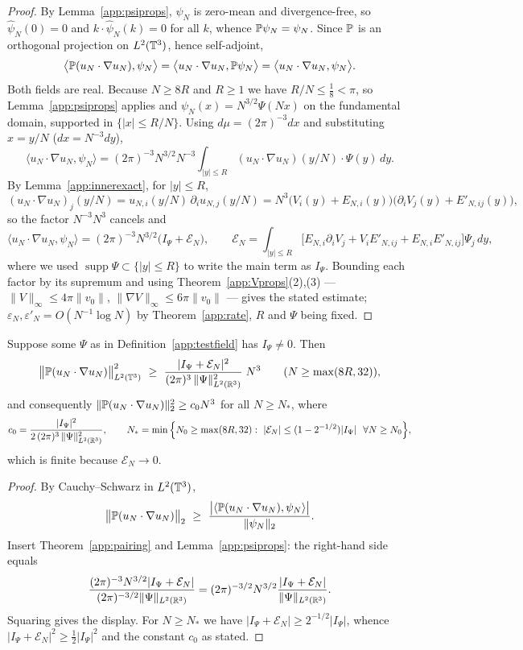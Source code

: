 \begin{proof}
By Lemma~\ref{app:psiprops}, $\psi_N$ is zero-mean and divergence-free,
so $\hat\psi_N(0)=0$ and $k\cdot\hat\psi_N(k)=0$ for all $k$, whence
$\mathbb P\psi_N=\psi_N$. Since $\mathbb P$ is an orthogonal projection on
$L^2(\mathbb T^3)$, hence self-adjoint,
\[
\big\langle\mathbb P(u_N\cdot\nabla u_N),\psi_N\big\rangle
=\big\langle u_N\cdot\nabla u_N,\mathbb P\psi_N\big\rangle
=\big\langle u_N\cdot\nabla u_N,\psi_N\big\rangle .
\]
Both fields are real. Because $N\ge8R$ and $R\ge1$ we have
$R/N\le\tfrac18<\pi$, so Lemma~\ref{app:psiprops} applies and
$\psi_N(x)=N^{3/2}\Psi(Nx)$ on the fundamental domain, supported in
$\{|x|\le R/N\}$. Using $d\mu=(2\pi)^{-3}dx$ and substituting $x=y/N$
($dx=N^{-3}dy$),
\[
\big\langle u_N\cdot\nabla u_N,\psi_N\big\rangle
=(2\pi)^{-3}N^{3/2}N^{-3}\int_{|y|\le R}
(u_N\cdot\nabla u_N)(y/N)\cdot\Psi(y)\,dy .
\]
By Lemma~\ref{app:innerexact}, for $|y|\le R$,
\[
(u_N\cdot\nabla u_N)_j(y/N)
=u_{N,i}(y/N)\,\partial_iu_{N,j}(y/N)
=N^{3}\big(V_i(y)+E_{N,i}(y)\big)\big(\partial_iV_j(y)+E'_{N,ij}(y)\big),
\]
so the factor $N^{-3}N^{3}$ cancels and
\[
\big\langle u_N\cdot\nabla u_N,\psi_N\big\rangle
=(2\pi)^{-3}N^{3/2}\big(I_\Psi+\mathcal E_N\big),
\qquad
\mathcal E_N=\int_{|y|\le R}
\big[E_{N,i}\partial_iV_j+V_iE'_{N,ij}+E_{N,i}E'_{N,ij}\big]\Psi_j\,dy ,
\]
where we used $\operatorname{supp}\Psi\subset\{|y|\le R\}$ to write the
main term as $I_\Psi$. Bounding each factor by its supremum and using
Theorem~\ref{app:Vprops}(2),(3) --- $\|V\|_\infty\le4\pi\|v_0\|$,
$\|\nabla V\|_\infty\le6\pi\|v_0\|$ --- gives the stated estimate;
$\varepsilon_N,\varepsilon'_N=O(N^{-1}\log N)$ by
Theorem~\ref{app:rate}, $R$ and $\Psi$ being fixed.
\end{proof}

\begin{proposition}
\label{app:N3}
Suppose some $\Psi$ as in Definition~\ref{app:testfield} has
$I_\Psi\neq0$. Then
\[
\big\|\mathbb P(u_N\cdot\nabla u_N)\big\|_{L^2(\mathbb T^3)}^2
\ \ge\ \frac{|I_\Psi+\mathcal E_N|^2}
{(2\pi)^{3}\,\|\Psi\|_{L^2(\mathbb R^3)}^{2}}\;N^{3}
\qquad(N\ge\max(8R,32)),
\]
and consequently
$\|\mathbb P(u_N\cdot\nabla u_N)\|_{2}^2\ge c_0N^3$ for all $N\ge N_*$, where
\[
c_0=\frac{|I_\Psi|^2}{2\,(2\pi)^{3}\,\|\Psi\|_{L^2(\mathbb R^3)}^{2}},
\qquad
N_*=\min\Big\{N_0\ge\max(8R,32):\ |\mathcal E_N|\le(1-2^{-1/2})|I_\Psi|
\ \ \forall N\ge N_0\Big\},
\]
which is finite because $\mathcal E_N\to0$.
\end{proposition}

\begin{proof}
By Cauchy--Schwarz in $L^2(\mathbb T^3)$,
\[
\big\|\mathbb P(u_N\cdot\nabla u_N)\big\|_{2}
\ \ge\ \frac{\big|\langle\mathbb P(u_N\cdot\nabla u_N),\psi_N\rangle\big|}
{\|\psi_N\|_{2}} .
\]
Insert Theorem~\ref{app:pairing} and Lemma~\ref{app:psiprops}: the
right-hand side equals
\[
\frac{(2\pi)^{-3}N^{3/2}|I_\Psi+\mathcal E_N|}
{(2\pi)^{-3/2}\|\Psi\|_{L^2(\mathbb R^3)}}
=(2\pi)^{-3/2}N^{3/2}\frac{|I_\Psi+\mathcal E_N|}{\|\Psi\|_{L^2(\mathbb R^3)}} .
\]
Squaring gives the display. For $N\ge N_*$ we have
$|I_\Psi+\mathcal E_N|\ge2^{-1/2}|I_\Psi|$, whence
$|I_\Psi+\mathcal E_N|^2\ge\tfrac12|I_\Psi|^2$ and the constant $c_0$ as
stated.
\end{proof}

